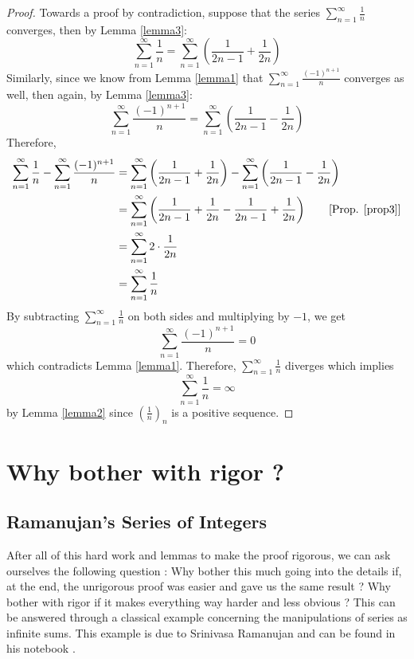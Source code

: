 \documentclass[12pt]{article}
\theoremstyle{definition}
\newcounter{prop}[section]
\begin{document}
\begin{proof}
    Towards a proof by contradiction, suppose that the series $\sum_{n=1}^{\infty}\frac{1}{n}$ converges, then by Lemma \ref{lemma3}:
    $$\sum_{n=1}^{\infty}\frac{1}{n} = \sum_{n=1}^{\infty}\left(\frac{1}{2n-1} + \frac{1}{2n}\right)$$
    Similarly, since we know from Lemma \ref{lemma1} that $\sum_{n=1}^{\infty}\frac{(-1)^{n+1}}{n}$ converges as well, then again, by Lemma \ref{lemma3}:
    $$\sum_{n=1}^{\infty}\frac{(-1)^{n+1}}{n} = \sum_{n=1}^{\infty}\left(\frac{1}{2n-1} - \frac{1}{2n}\right)$$
    Therefore,
    \begin{align*}
        \sum_{n=1}^{\infty}\frac{1}{n} - \sum_{n=1}^{\infty}\frac{(-1)^{n+1}}{n} &= \sum_{n=1}^{\infty}\left(\frac{1}{2n-1} + \frac{1}{2n}\right) - \sum_{n=1}^{\infty}\left(\frac{1}{2n-1} - \frac{1}{2n}\right) \\
        &= \sum_{n=1}^{\infty}\left(\frac{1}{2n-1} + \frac{1}{2n} - \frac{1}{2n-1} + \frac{1}{2n}\right) \tag*{[Prop. \ref{prop3}]} \\
        &= \sum_{n=1}^{\infty}2\cdot \frac{1}{2n} \\
        &= \sum_{n=1}^{\infty}\frac{1}{n} \\
    \end{align*}
    By subtracting $\sum_{n=1}^{\infty}\frac{1}{n}$ on both sides and multiplying by $-1$, we get
    $$ \sum_{n=1}^{\infty}\frac{(-1)^{n+1}}{n} = 0$$
    which contradicts Lemma \ref{lemma1}. Therefore, $\sum_{n=1}^{\infty}\frac{1}{n}$ diverges which implies 
    $$\sum_{n=1}^{\infty}\frac{1}{n} = \infty$$
    by Lemma \ref{lemma2} since $(\frac{1}{n})_n$ is a positive sequence.
\end{proof}

\section{Why bother with rigor ?}

\subsection{Ramanujan's Series of Integers}

After all of this hard work and lemmas to make the proof rigorous, we can ask ourselves the following question : Why bother this much going into the details if, at the end, the unrigorous proof was easier and gave us the same result ? Why bother with rigor if it makes everything way harder and less obvious ? This can be answered through a classical example concerning the manipulations of series as infinite sums. This example is due to Srinivasa Ramanujan and can be found in his notebook \cite{berndt2012ramanujan}.
\end{document}
